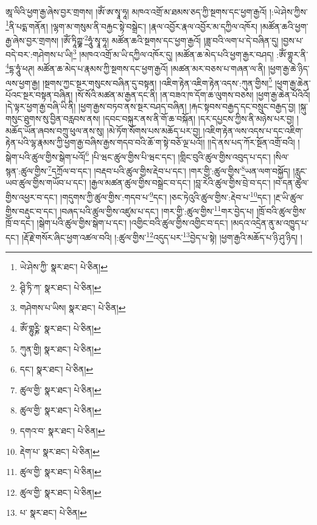 ཨཱ་ལིའི་ཕྱག་རྒྱ་ཞེས་བྱར་གྲགས། །ཨོཾ་ཨ་སྭཱ་ཧཱ། མཁའ་འགྲོ་མ་ཐམས་ཅད་ཀྱི་སྔགས་དང་ཕྱག་རྒྱའོ། །:ཡེ་ཤེས་ཀྱིས་\footnote{ཡེ་ཤེས་ཀྱི་  སྣར་ཐང་།  པེ་ཅིན། }ནི་པདྨ་གནོན། །ལྷག་མ་གསུམ་ནི་བརྐྱང་སྟེ་བསྒྲེང་། །རྣལ་འབྱོར་རྣལ་འབྱོར་མ་དཀྱིལ་འཁོར། །མཚོན་ཆའི་ཕྱག་རྒྱ་ཞེས་བྱར་གྲགས། །ཨོཾ་ཏཱིཀྵྞ་\footnote{ཤྚི་ཏི་ཀ་  སྣར་ཐང་།  པེ་ཅིན། }ཧཱུཾ་སྭཱ་ཧཱ། མཚོན་ཆའི་སྔགས་དང་ཕྱག་རྒྱའོ། །ཟླ་བའི་ལག་པ་དེ་བཞིན་དུ། །བྱས་པ་བདེ་བར་:གཤེགས་པ་ཡི།\footnote{གཤེགས་པ་ཡིས།  སྣར་ཐང་།  པེ་ཅིན། } །མཁའ་འགྲོ་མ་ཡི་དཀྱིལ་འཁོར་དུ། །མཚོན་ཆ་མེད་པའི་ཕྱག་རྒྱར་བཤད། :ཨོཾ་གྷུར་ནི་\footnote{ཨོཾ་གྷུཪྞི་  སྣར་ཐང་།  པེ་ཅིན། }དྷ་ཧཱུཾ་ཕཊ། མཚོན་ཆ་མེད་པ་རྣམས་ཀྱི་སྔགས་དང་ཕྱག་རྒྱའོ། །མཚན་མར་བཅས་པ་གཞན་ལ་ནི། །ཕྱག་རྒྱ་ཆེ་ཉིད་ལས་ཕྱག་རྒྱ། །སྔགས་ཀྱང་སྔར་གསུངས་བཞིན་དུ་བསྟན། །འཇིག་རྟེན་འཇིག་རྟེན་འདས་:ཀུན་གྱིས།\footnote{ཀུན་གྱི།  སྣར་ཐང་།  པེ་ཅིན། } །ཕྱག་རྒྱ་ཆེན་པོའང་སྔར་བསྟན་བཞིན། །སོ་སོའི་མཚན་མ་རྒྱན་དང་ནི། །ན་བཟའ་ཁ་དོག་ཆ་ལུགས་བཅས། །ཕྱག་རྒྱ་ཆེན་པོའིའོ། །དེ་ལྟར་ཕྱག་རྒྱ་བཞི་ཡི་ནི། །ཕྱག་རྒྱས་བཏབ་ནས་སྔར་བཤད་བཞིན། །རྐང་སྟབས་བརྒྱད་དང་བསྲུང་བརྒྱད་བྱ། །སྐུ་གསུང་ཐུགས་སུ་བྱིན་བརླབས་ནས། །དབང་བསྐུར་ནས་ནི་གོ་ཆ་བསྐོན། །དར་དཔྱངས་ཀྱིས་ནི་མཉེས་པར་བྱ། །མཆོད་ཡོན་ཞབས་བཀྲུ་ཕུལ་ནས་སུ། །མེ་ཏོག་སོགས་པས་མཆོད་པར་བྱ། །འཇིག་རྟེན་ལས་འདས་པ་དང་འཇིག་རྟེན་པའི་ལྷ་རྣམས་ཀྱི་ཕྱག་རྒྱ་བཞིས་རྒྱས་གདབ་བའི་ཆོ་ག་སྟེ་བཅོ་ལྔ་པའོ།། །།དེ་ནས་པད་ཀོར་སྔོན་འགྲོ་བའི། །སྒེག་པའི་ཚུལ་གྱིས་སྒེག་པའོ།\footnote{དང་།  སྣར་ཐང་།  པེ་ཅིན། } །པི་ཝང་ཚུལ་གྱིས་པི་ཝང་དང་། །གླིང་བུའི་ཚུལ་གྱིས་འབུད་པ་དང་། །སིལ་སྙན་:ཚུལ་གྱིས་\footnote{ཚུལ་གྱི་  སྣར་ཐང་།  པེ་ཅིན། }དཀྲོལ་བ་དང་། །བརྡབ་པའི་ཚུལ་གྱིས་རྡེབ་པ་དང་། །གར་གྱི་:ཚུལ་གྱིས་\footnote{ཚུལ་གྱི་  སྣར་ཐང་།  པེ་ཅིན། }ཡན་ལག་བསྐྱོད། །རླུང་ཡབ་ཚུལ་གྱིས་གཡོབ་པ་དང་། །རྒྱལ་མཚན་ཚུལ་གྱིས་བསྒྲེང་བ་དང་། །བླ་རེའི་ཚུལ་གྱིས་བྲེ་བ་དང་། །བ་དན་ཚུལ་གྱིས་འཕྱར་བ་དང་། །གདུགས་ཀྱི་ཚུལ་གྱིས་:གདབ་པ་\footnote{དགའ་བ་  སྣར་ཐང་།  པེ་ཅིན། }དང་། །ཅང་ཏེའུའི་ཚུལ་གྱིས་:རྡེབ་པ་\footnote{རྡེག་པ་  སྣར་ཐང་།  པེ་ཅིན། }དང་། །རྔ་ཡི་ཚུལ་གྱིས་བརྡུང་བ་དང་། །བཞད་པའི་ཚུལ་གྱིས་འཛུམ་པ་དང་། །གར་གྱི་:ཚུལ་གྱིས་\footnote{ཚུལ་གྱི་  སྣར་ཐང་།  པེ་ཅིན། }གར་བྱེད་པ། །ཁྲོ་བའི་ཚུལ་གྱིས་ཁྲོ་བ་དང་། །སྒེག་པའི་ཚུལ་གྱིས་སྒེག་པ་དང་། །འགྱིང་བའི་ཚུལ་གྱིས་འགྱིང་བ་དང་། །མདའ་འདྲེན་ནུ་མ་འཁྱུད་པ་དང་། །རྡོ་རྗེ་གསོར་ཞིང་ཕྱག་འཚལ་བའི། །:ཚུལ་གྱིས་\footnote{ཚུལ་གྱི་  སྣར་ཐང་།  པེ་ཅིན། }འདུད་པར་\footnote{པ་  སྣར་ཐང་།  པེ་ཅིན། }བྱེད་པ་སྟེ། །ཕྱག་རྒྱའི་མཆོད་པ་ཉི་ཤུ་ཉིད། །

